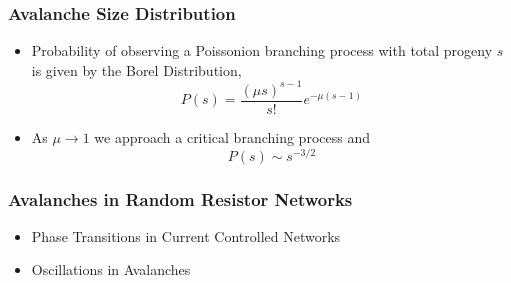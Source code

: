 \documentclass[mathserif]{beamer}
\begin{document}
\begin{frame}
\frametitle{Avalanche Size Distribution}
\begin{itemize}
\item Probability of observing a Poissonion branching process with total progeny $s$ is given
by the Borel Distribution,
$$P(s) = \frac{(\mu s)^{s-1}}{s!} e^{-\mu(s-1)}$$
\item As $\mu\to 1$ we approach a critical branching process and
$$P(s) \sim s^{-3/2}$$
\end{itemize}
\end{frame}

\begin{frame}
\frametitle{Avalanches in Random Resistor Networks}

\end{frame}

\begin{frame}
\begin{itemize}
\item Phase Transitions in Current Controlled Networks
\item Oscillations in Avalanches
\end{itemize}
\end{frame}
\end{document}
